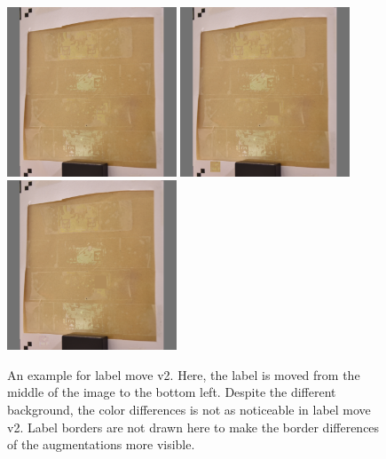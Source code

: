 \documentclass[10pt]{book}
\begin{document}
\begin{figure}
  \centering
     {\includegraphics[width=0.45\textwidth]{image/aug_lm2_before}}
     {\includegraphics[width=0.45\textwidth]{image/aug_lm2_after_old}}
     {\includegraphics[width=0.45\textwidth]{image/aug_lm2_after}}
  \caption{An example for label move v2. Here, the label is moved from the middle of the image to the bottom left. Despite the different background, the color differences is not as noticeable in label move v2. Label borders are not drawn here to make the border differences of the augmentations more visible.}
  \label{fig:aug_lm2_example}
\end{figure}
\end{document}
